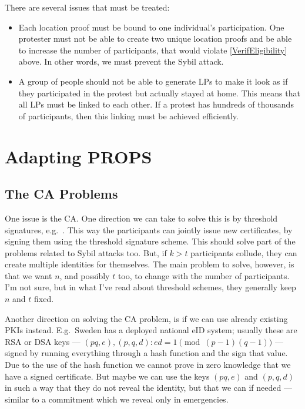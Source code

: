 There are several issues that must be treated:
\begin{itemize}
  \item Each location proof must be bound to one individual's participation.
    One protester must not be able to create two unique location proofs and be 
    able to increase the number of participants, that would violate 
    \cref{VerifEligibility} above.
    In other words, we must prevent the Sybil attack.

  \item A group of people should not be able to generate \acp{LP} to make it 
    look as if they participated in the protest but actually stayed at home.
    This means that all \acp{LP} must be linked to each other.
    If a protest has hundreds of thousands of participants, then this linking 
    must be achieved efficiently.
\end{itemize}


\section{Adapting PROPS}
\label{AdaptingPROPS}

\subsection{The \acs*{CA} Problems}

One issue is the \ac{CA}.
One direction we can take to solve this is by threshold signatures, e.g.\ 
\cite{FSThresholdSignatures}.
This way the participants can jointly issue new certificates, by signing them 
using the threshold signature scheme.
This should solve part of the problems related to Sybil attacks too.
But, if \(k > t\) participants collude, they can create multiple identities for 
themselves.
The main problem to solve, however, is that we want \(n\), and possibly \(t\) 
too, to change with the number of participants.
I'm not sure, but in what I've read about threshold schemes, they generally 
keep \(n\) and \(t\) fixed.

Another direction on solving the \ac{CA} problem, is if we can use already 
existing \acp{PKI} instead.
E.g.\ Sweden has a deployed national \ac{eID} system; usually these are RSA or 
DSA keys --- \((pq, e), (p, q, d): ed = 1\pmod{(p-1)(q-1)}\) --- signed by 
running everything through a hash function and the sign that value.
Due to the use of the hash function we cannot prove in zero knowledge that we 
have a signed certificate.
But maybe we can use the keys \((pq, e)\) and \((p, q, d)\) in such a way that 
they do not reveal the identity, but that we can if needed --- similar to 
a commitment which we reveal only in emergencies.

